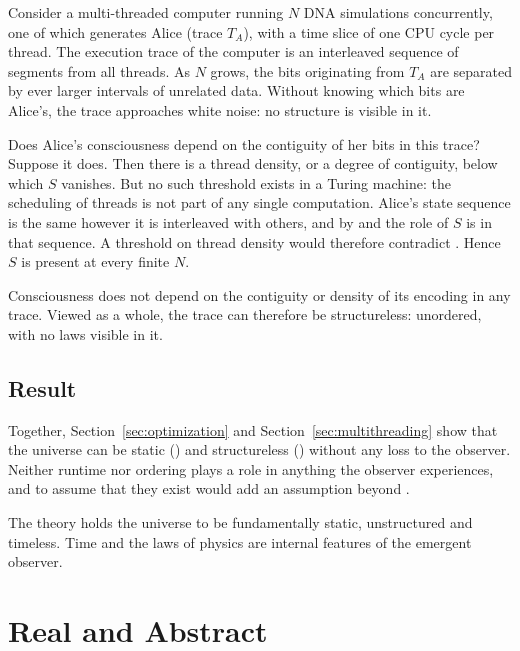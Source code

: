 \documentclass[11pt]{book}
\begin{document}
Consider a multi-threaded computer running $N$ DNA simulations
concurrently, one of which generates Alice (trace $T_A$), with a time
slice of one CPU cycle per thread. The execution trace of the computer is
an interleaved sequence of segments from all threads. As $N$ grows, the
bits originating from $T_A$ are separated by ever larger intervals of
unrelated data. Without knowing which bits are Alice's, the trace
approaches white noise: no structure is visible in it.

Does Alice's consciousness depend on the contiguity of her bits in this
trace? Suppose it does. Then there is a thread density, or a degree of
contiguity, below which $S$ vanishes. But no such threshold exists in a
Turing machine: the scheduling of threads is not part of any single
computation. Alice's state sequence is the same however it is interleaved
with others, and by  and  the role of
$S$ is in that sequence. A threshold on thread density would therefore
contradict . Hence $S$ is present at every finite
$N$.

\begin{deduction}\label{ded:structureless}
  Consciousness does not depend on the contiguity or density of its
  encoding in any trace. Viewed as a whole, the trace can therefore be
  structureless: unordered, with no laws visible in it.
\end{deduction}


\section{Result}

Together, Section~\ref{sec:optimization} and
Section~\ref{sec:multithreading} show that the universe can be static
() and structureless () without any
loss to the observer. Neither runtime nor ordering plays a role in
anything the observer experiences, and to assume that they exist would add
an assumption beyond \AssumptionSet.

\begin{deduction}\label{ded:universe}
  The theory holds the universe to be fundamentally static, unstructured
  and timeless. Time and the laws of physics are internal features of the
  emergent observer.
\end{deduction}




\chapter{Real and Abstract}
\label{ch:abstract}
\end{document}
